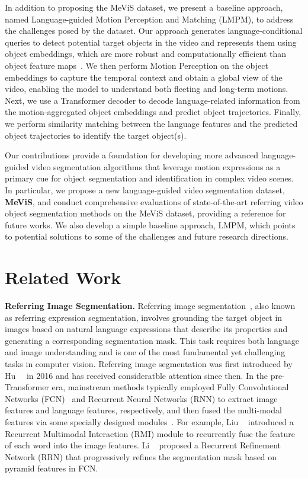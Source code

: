 \documentclass[10pt,twocolumn,letterpaper]{article}
\newcommand{\ourdataset}{MeViS\xspace}
\newcommand{\ourmodel}{LMPM\xspace}
\begin{document}
In addition to proposing the \ourdataset dataset, we present a baseline approach, named Language-guided Motion Perception and Matching (\ourmodel), to address the challenges posed by the dataset. Our approach generates language-conditional queries to detect potential target objects in the video and represents them using object embeddings, which are more robust and computationally efficient than object feature maps~\cite{VITA}. We then perform Motion Perception on the object embeddings to capture the temporal context and obtain a global view of the video, enabling the model to understand both fleeting and long-term motions. Next, we use a Transformer decoder to decode language-related information from the motion-aggregated object embeddings and predict object trajectories. 
Finally, we perform similarity matching between the language features and the predicted object trajectories to identify the target object(s).

Our contributions provide a foundation for developing more advanced language-guided video segmentation algorithms that leverage motion expressions as a primary cue for object segmentation and identification in complex video scenes. In particular, we propose a new language-guided video segmentation dataset, \textbf{\ourdataset}, and conduct comprehensive evaluations of state-of-the-art referring video object segmentation methods on the \ourdataset dataset, providing a reference for future works. We also develop a simple baseline approach, \ourmodel, which points to potential solutions to some of the challenges and future research directions.
 \section{Related Work}


\noindent\textbf{Referring Image Segmentation.}
Referring image segmentation~\cite{ding2021vision,vltpami,GRES,ding2020phraseclick,M3Att}, also known as referring expression segmentation, involves grounding the target object in images based on natural language expressions that describe its properties and generating a corresponding segmentation mask. This task requires both language and image understanding and is one of the most fundamental yet challenging tasks in computer vision. Referring image segmentation was first introduced by Hu~\etal~\cite{hu2016segmentation} in 2016 and has received consideratble attention since then. In the pre-Transformer era, mainstream methods typically employed Fully Convolutional Networks (FCN)~\cite{long2015fully,ding2018context,BFP} and Recurrent Neural Networks (RNN) to extract image features and language features, respectively, and then fused the multi-modal features via some specially designed modules~\cite{liu2017recurrent,li2018referring,feng2021encoder,margffoy2018dynamic}. For example, Liu \etal~\cite{liu2017recurrent} introduced a Recurrent Multimodal Interaction (RMI) module to recurrently fuse the feature of each word into the image features. Li \etal~\cite{li2018referring} proposed a Recurrent Refinement Network (RRN) that progressively refines the segmentation mask based on pyramid features in FCN.
\end{document}
